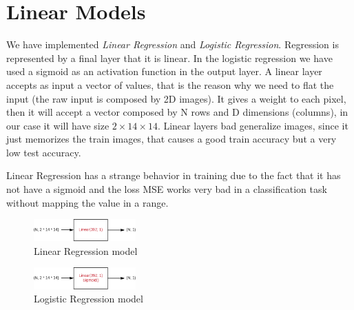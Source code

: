 \documentclass[journal, a4paper]{IEEEtran}
\begin{document}
\section{Linear Models}
\label{sec:linearmodel}
We have implemented \textit{Linear Regression} and \textit{Logistic Regression}. Regression is represented by a final layer that it is linear. In the logistic regression we have used a sigmoid as an activation function in the output layer. A linear layer accepts as input a vector of values, that is the reason why we need to flat the input (the raw input is composed by 2D images). It gives a weight to each pixel, then it will accept a vector composed by N rows and D dimensions (columns), in our case it will have size $2 \times 14 \times 14$. Linear layers bad generalize images, since it just memorizes the train images, that causes a good train accuracy but a very low test accuracy.

Linear Regression has a strange behavior in training due to the fact that it has not have a sigmoid and the loss MSE works very bad in a classification task without mapping the value in a range.

\begin{figure}[!h]
    \centering
    \includegraphics[width=0.35\textwidth]{linearregression.png}
    \caption{Linear Regression model}
    \label{fig:linearregression}
\end{figure}

\begin{figure}[!h]
    \centering
    \includegraphics[width=0.35\textwidth]{logistic.png}
    \caption{Logistic Regression model}
    \label{fig:logisticregression}
\end{figure}
\end{document}
